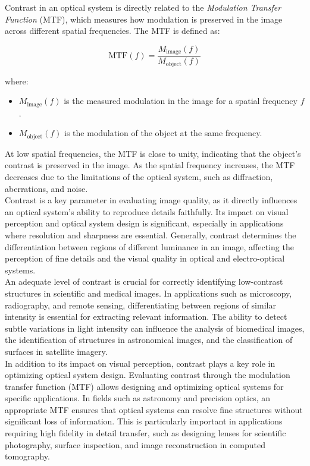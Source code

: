 Contrast in an optical system is directly related to the \textit{Modulation Transfer Function} (MTF), which measures how modulation is preserved in the image across different spatial frequencies. The MTF is defined as:

\begin{equation}
\text{MTF}(f) = \frac{M_{\text{image}}(f)}{M_{\text{object}}(f)}
\label{eq:mtf}
\end{equation}

where:
\begin{itemize}
    \item $M_{\text{image}}(f)$ is the measured modulation in the image for a spatial frequency $f$.
    \item $M_{\text{object}}(f)$ is the modulation of the object at the same frequency.
\end{itemize}

At low spatial frequencies, the MTF is close to unity, indicating that the object's contrast is preserved in the image. As the spatial frequency increases, the MTF decreases due to the limitations of the optical system, such as diffraction, aberrations, and noise.\\

Contrast is a key parameter in evaluating image quality, as it directly influences an optical system’s ability to reproduce details faithfully. Its impact on visual perception and optical system design is significant, especially in applications where resolution and sharpness are essential. Generally, contrast determines the differentiation between regions of different luminance in an image, affecting the perception of fine details and the visual quality in optical and electro-optical systems.\\

An adequate level of contrast is crucial for correctly identifying low-contrast structures in scientific and medical images. In applications such as microscopy, radiography, and remote sensing, differentiating between regions of similar intensity is essential for extracting relevant information. The ability to detect subtle variations in light intensity can influence the analysis of biomedical images, the identification of structures in astronomical images, and the classification of surfaces in satellite imagery.\\

In addition to its impact on visual perception, contrast plays a key role in optimizing optical system design. Evaluating contrast through the modulation transfer function (MTF) allows designing and optimizing optical systems for specific applications. In fields such as astronomy and precision optics, an appropriate MTF ensures that optical systems can resolve fine structures without significant loss of information. This is particularly important in applications requiring high fidelity in detail transfer, such as designing lenses for scientific photography, surface inspection, and image reconstruction in computed tomography.\\

